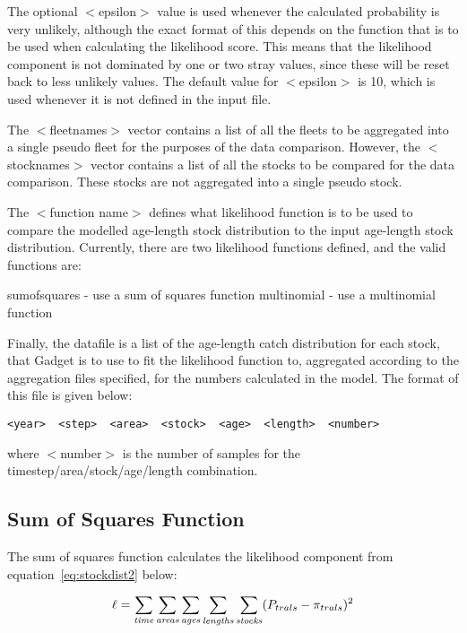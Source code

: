 \documentclass[10pt,twoside]{book}
\begin{document}
\bigskip
The optional $<$epsilon$>$ value is used whenever the calculated probability is very unlikely, although the exact format of this depends on the function that is to be used when calculating the likelihood score.  This means that the likelihood component is not dominated by one or two stray values, since these will be reset back to less unlikely values.  The default value for $<$epsilon$>$ is 10, which is used whenever it is not defined in the input file.

\bigskip
The $<$fleetnames$>$ vector contains a list of all the fleets to be aggregated into a single pseudo fleet for the purposes of the data comparison.  However, the $<$stocknames$>$ vector contains a list of all the stocks to be compared for the data comparison.  These stocks are not aggregated into a single pseudo stock.

\bigskip
The $<$function name$>$ defines what likelihood function is to be used to compare the modelled age-length stock distribution to the input age-length stock distribution.  Currently, there are two likelihood functions defined, and the  valid functions are:

\bigskip
sumofsquares - use a sum of squares function\newline
multinomial - use a multinomial function

\bigskip
Finally, the datafile is a list of the age-length catch distribution for each stock, that Gadget is to use to fit the likelihood function to, aggregated according to the aggregation files specified, for the numbers calculated in the model.  The format of this file is given below:

{\small\begin{verbatim}
<year>  <step>  <area>  <stock>  <age>  <length>  <number>
\end{verbatim}}

where $<$number$>$ is the number of samples for the timestep/area/stock/age/length combination.

\subsection{Sum of Squares Function}
The sum of squares function calculates the likelihood component from equation~\ref{eq:stockdist2} below:

\begin{equation}\label{eq:stockdist2}
\ell = \sum_{\it time}\sum_{\it areas}\sum_{\it ages}\sum_{\it lengths}\sum_{\it stocks} ( P_{trals} - \pi_{trals} ) ^2
\end{equation}
\end{document}
